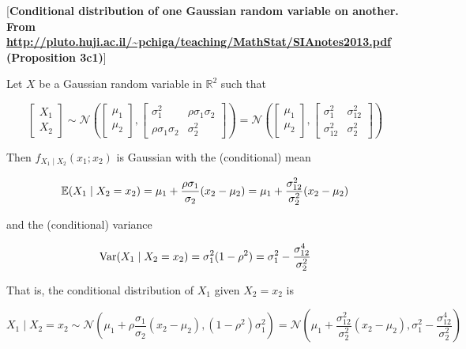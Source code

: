 %
%

\begin{proposition}\label{prob.cond.bivar.norm.dist}[\textbf{Conditional distribution of one Gaussian random variable on another. From \url{http://pluto.huji.ac.il/~pchiga/teaching/MathStat/SIAnotes2013.pdf} (Proposition 3c1)}]

Let \(X\) be a Gaussian random variable in \(\mathbb{R}^2\) such that

\[
\begin{bmatrix} X_1 \\ X_2 \end{bmatrix}  \sim \mathcal{N}\left(\begin{bmatrix} \mu_1 \\ \mu_2 \end{bmatrix}, \begin{bmatrix} \sigma_1^2 & \rho \sigma_1 \sigma_2 \\  \rho \sigma_1 \sigma_2 & \sigma_2^2 \end{bmatrix}  \right) =  \mathcal{N}\left(\begin{bmatrix} \mu_1 \\ \mu_2 \end{bmatrix}, \begin{bmatrix} \sigma_1^2 &\sigma_{12}^2 \\  \sigma_{12}^2 & \sigma_2^2 \end{bmatrix}  \right)
\]

Then \(f_{X_1 \mid X_2}(x_1; x_2)\) is Gaussian with the (conditional) mean

\[
\E(X_1 \mid X_2 = x_2) = \mu_1 + \frac{\rho \sigma_1}{\sigma_2} (x_2 - \mu_2) = \mu_1 + \frac{\sigma_{12}^2}{ \sigma_2^2} (x_2 - \mu_2)
\]

and the (conditional) variance

\[
\Var(X_1 \mid X_2 = x_2) = \sigma_1^2 (1 - \rho^2) =  \sigma_1^2 - \frac{\sigma_{12}^4}{ \sigma_2^2}
\]

That is, the conditional distribution of \(X_1\) given \(X_2 = x_2\) is

\[
X_1 \mid X_2 = x_2 \sim \mathcal{N} \left( \mu_1 + \rho \frac{\sigma_1}{\sigma_2}(x_2 - \mu_2), (1 - \rho^2)\sigma_1^2 \right) = \mathcal{N} \left( \mu_1 + \frac{\sigma_{12}^2}{ \sigma_2^2} (x_2 - \mu_2), \sigma_1^2 - \frac{\sigma_{12}^4}{ \sigma_2^2} \right)
\]
\end{proposition} 

